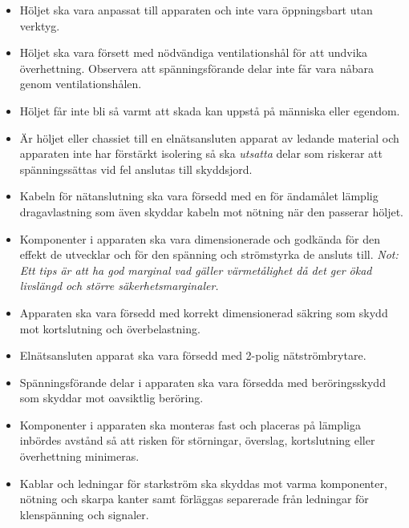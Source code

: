 \begin{itemize}
\item Höljet ska vara anpassat till apparaten och inte vara öppningsbart
  utan verktyg.

\item Höljet ska vara försett med nödvändiga ventilationshål för att
  undvika överhettning.
  Observera att spänningsförande delar inte får vara nåbara genom
  ventilationshålen.

\item Höljet får inte bli så varmt att skada kan uppstå på människa
  eller egendom.

\item Är höljet eller chassiet till en elnätsansluten apparat av ledande
  material och apparaten inte har förstärkt isolering så ska \emph{utsatta}
  delar som riskerar att spänningssättas vid fel anslutas till skyddsjord.

\item Kabeln för nätanslutning ska vara försedd med en för ändamålet lämplig
  dragavlastning som även skyddar kabeln mot nötning när den passerar höljet.

\item Komponenter i apparaten ska vara dimensionerade och godkända
  för den effekt de utvecklar och för den spänning och strömstyrka de
  ansluts till.
  \emph{Not: Ett tips är att ha god marginal vad gäller värmetålighet då det
    ger ökad livslängd och större säkerhetsmarginaler.}

\item Apparaten ska vara försedd med korrekt dimensionerad säkring
  som skydd mot kortslutning och överbelastning.

\item Elnätsansluten apparat ska vara försedd med 2-polig nätströmbrytare.

\item Spänningsförande delar i apparaten ska vara försedda med
  beröringsskydd som skyddar mot oavsiktlig beröring.

\item Komponenter i apparaten ska monteras fast och placeras på lämpliga
  inbördes avstånd så att risken för störningar, överslag, kortslutning eller
  överhettning minimeras.

\item Kablar och ledningar för starkström ska skyddas mot varma komponenter,
  nötning och skarpa kanter samt förläggas separerade från ledningar för
  klenspänning och signaler.
\end{itemize}

